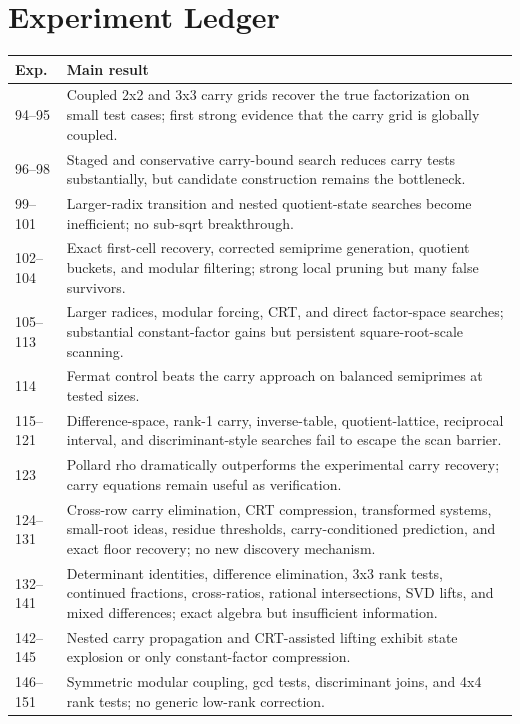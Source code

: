 \documentclass[11pt,a4paper]{article}
\begin{document}
\section*{Experiment Ledger}
\begin{longtable}{@{}p{}p{}@{}}
\toprule
\textbf{Exp.} & \textbf{Main result}\\
\midrule
94--95 & Coupled 2x2 and 3x3 carry grids recover the true factorization on small test cases; first strong evidence that the carry grid is globally coupled.\\
96--98 & Staged and conservative carry-bound search reduces carry tests substantially, but candidate construction remains the bottleneck.\\
99--101 & Larger-radix transition and nested quotient-state searches become inefficient; no sub-sqrt breakthrough.\\
102--104 & Exact first-cell recovery, corrected semiprime generation, quotient buckets, and modular filtering; strong local pruning but many false survivors.\\
105--113 & Larger radices, modular forcing, CRT, and direct factor-space searches; substantial constant-factor gains but persistent square-root-scale scanning.\\
114 & Fermat control beats the carry approach on balanced semiprimes at tested sizes.\\
115--121 & Difference-space, rank-1 carry, inverse-table, quotient-lattice, reciprocal interval, and discriminant-style searches fail to escape the scan barrier.\\
123 & Pollard rho dramatically outperforms the experimental carry recovery; carry equations remain useful as verification.\\
124--131 & Cross-row carry elimination, CRT compression, transformed systems, small-root ideas, residue thresholds, carry-conditioned prediction, and exact floor recovery; no new discovery mechanism.\\
132--141 & Determinant identities, difference elimination, 3x3 rank tests, continued fractions, cross-ratios, rational intersections, SVD lifts, and mixed differences; exact algebra but insufficient information.\\
142--145 & Nested carry propagation and CRT-assisted lifting exhibit state explosion or only constant-factor compression.\\
146--151 & Symmetric modular coupling, gcd tests, discriminant joins, and 4x4 rank tests; no generic low-rank correction.\\

\end{longtable}
\end{document}
